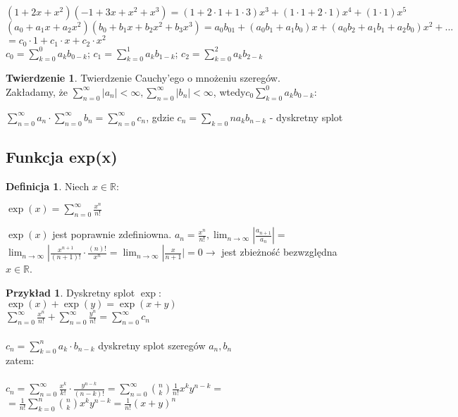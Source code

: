 \documentclass{article}
\theoremstyle{definition}
\newtheorem{de}{Definicja}[subsection]
\theoremstyle{definition}
\newtheorem{tw}{Twierdzenie}[subsection]
\theoremstyle{definition}
\newtheorem{pk}{Przykład}[subsection]
\theoremstyle{definition}
\begin{document}
$(1+2x+x^2)(-1+3x+x^2+x^3)=(1+2\cdot 1 + 1\cdot 3)x^3 + (1\cdot 1 + 2\cdot 1) x^4 + (1\cdot 1) x^5$
$(a_0+a_1x+a_2x^2)(b_0+b_1x+b_2x^2+b_3x^3)=a_0b_01 + (a_0b_1 + a_1b_0) x + (a_0b_2+a_1b_1 + a_2b_0) x^2 + ...$
$=c_0\cdot 1 + c_1\cdot x + c_2\cdot x^2$\\

$c_0= \sum_{k=0}^0 a_k b_{0-k}$; $c_1= \sum_{k=0}^1 a_k b_{1-k}$; $c_2= \sum_{k=0}^2 a_k b_{2-k}$

\begin{tw}
    Twierdzenie Cauchy'ego o mnożeniu szeregów. \\
    Zakładamy, że $\sum_{n=0}^{\infty} |a_n| < \infty, \sum_{n=0}^{\infty} |b_n | < \infty$, wtedy$c_0 \sum_{k=0}^0 a_k b_{0-k}$:
    \begin{center}
        $\sum_{n=0}^{\infty} a_n \cdot \sum_{n=0}^{\infty} b_n = \sum_{n=0}^{\infty} c_n$, gdzie
        $c_n=\sum_{k=0}{n} a_k b_{n-k}$ - dyskretny splot
    \end{center}
\end{tw}

\subsection{Funkcja exp(x)}

\begin{de}
    Niech $x\in\mathbb{R}$:
    \begin{center}
        $\exp(x)=\sum_{n=0}^{\infty} \frac{x^n}{n!}$
    \end{center}
    $\exp(x)$ jest poprawnie zdefiniowna.
    $a_n=\frac{x^n}{n!}, \lim_{n\rightarrow \infty} | \frac{a_{n+1}}{a_n} | =$
    $\lim_{n\rightarrow \infty} | \frac{x^{n+1}}{(n+1)!} \cdot \frac{(n)!}{x^n} = \lim_{n\rightarrow \infty} |\frac{x}{n+1} | = 0\rightarrow$ jest zbieżność bezwzględna $x\in\mathbb{R}$.
\end{de}

\begin{pk}
Dyskretny splot $\exp$:\\
$\exp(x)+\exp(y)=\exp(x+y)$\\
$\sum_{n=0}^{\infty} \frac{x^n}{n!} + \sum_{n=0}^{\infty} \frac{y^n}{n!} = \sum_{n=0}^{\infty} c_n$\\\\
$c_n=\sum_{k=0}^{n} a_k \cdot b_{n-k}$ dyskretny splot szeregów $a_n, b_n$\\
zatem:\\\\
$c_n = \sum_{n=0}^{\infty} \frac{x^k}{k!} \cdot \frac{y^{n-k}}{(n-k)!} = \sum_{n=0}^{\infty} \binom{n}{k} \frac{1}{n!} x^k y^{n-k}=$
$=\frac{1}{n!} \sum_{k=0}^{n} \binom{n}{k} x^k y^{n-k} = \frac{1}{n!} (x+y)^n$\\
\end{pk}
\end{document}
